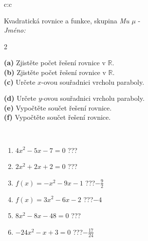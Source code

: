 \documentclass[10pt]{report}
\begin{document}
\begin{tabular}{c:c}
\begin{minipage}[c][104.5mm][t]{0.5\linewidth}
\begin{center}
\vspace{7mm}
{\huge \LARGE Kvadratická rovnice a funkce, skupina \textit{Mu $\mu$} -}\\[5mm]
\textit{Jméno:}\phantom{xxxxxxxxxxxxxxxxxxxxxxxxxxxxxxxxxxxxxxxxxxxxxxxxxxxxxxxxxxxxxxxxx}\\[5mm]
\begin{minipage}{0.95\linewidth}
\begin{center}
{\small \begin{multicols}{2} \raggedright
\textbf{(a)} Zjistěte počet řešení rovnice v \(\mathbb{R}\). \\[1mm]
\textbf{(b)} Zjistěte počet řešení rovnice v \(\mathbb{R}\). \\[1mm]
\textbf{(c)} Určete \(x\)-ovou souřadnici vrcholu paraboly. \par \columnbreak
\textbf{(d)} Určete \(y\)-ovou souřadnici vrcholu paraboly. \\[1mm]
\textbf{(e)} Vypočtěte součet řešení rovnice. \\[1mm]
\textbf{(f)} Vypočtěte součet řešení rovnice.
\end{multicols}
}
\end{center}
\end{minipage}
\\[4mm]
\begin{minipage}{0.79\linewidth}
\begin{center}
\begin{varwidth}{\linewidth}
\begin{enumerate}
\Large
\item $4x^2-5x-7=0$\quad \dotfill\; ???\;\dotfill {}
\item $2x^2+2x+2=0$\quad \dotfill\; ???\;\dotfill {}
\item $f(x)=-x^2-9x-1$\quad \dotfill\; ???\;\dotfill \quad $-\frac{9}{2}$
\item $f(x)=3x^2-6x-2$\quad \dotfill\; ???\;\dotfill \quad $-4$
\item $8x^2-8x-48=0$\quad \dotfill\; ???\;\dotfill {}
\item $-24x^2-x+3=0$\quad \dotfill\; ???\;\dotfill \quad $-\frac{17}{24}$
\end{enumerate}
\end{varwidth}
\end{center}
\end{minipage}

\end{center}
\end{minipage}
\end{tabular}
\end{document}

